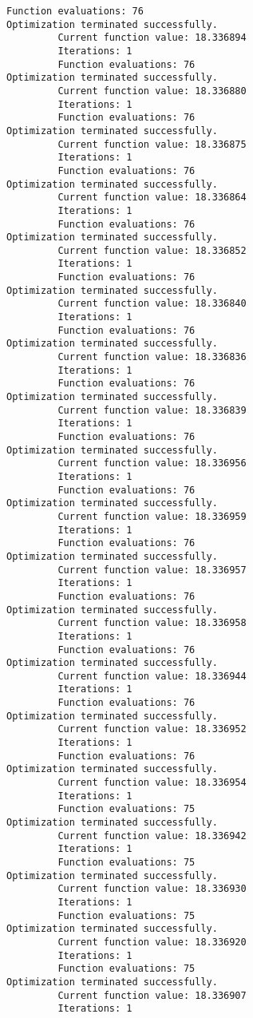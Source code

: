 \documentclass[11pt]{article}
\begin{document}
\begin{Verbatim}[commandchars=\\\{\}]
         Function evaluations: 76
Optimization terminated successfully.
         Current function value: 18.336894
         Iterations: 1
         Function evaluations: 76
Optimization terminated successfully.
         Current function value: 18.336880
         Iterations: 1
         Function evaluations: 76
Optimization terminated successfully.
         Current function value: 18.336875
         Iterations: 1
         Function evaluations: 76
Optimization terminated successfully.
         Current function value: 18.336864
         Iterations: 1
         Function evaluations: 76
Optimization terminated successfully.
         Current function value: 18.336852
         Iterations: 1
         Function evaluations: 76
Optimization terminated successfully.
         Current function value: 18.336840
         Iterations: 1
         Function evaluations: 76
Optimization terminated successfully.
         Current function value: 18.336836
         Iterations: 1
         Function evaluations: 76
Optimization terminated successfully.
         Current function value: 18.336839
         Iterations: 1
         Function evaluations: 76
Optimization terminated successfully.
         Current function value: 18.336956
         Iterations: 1
         Function evaluations: 76
Optimization terminated successfully.
         Current function value: 18.336959
         Iterations: 1
         Function evaluations: 76
Optimization terminated successfully.
         Current function value: 18.336957
         Iterations: 1
         Function evaluations: 76
Optimization terminated successfully.
         Current function value: 18.336958
         Iterations: 1
         Function evaluations: 76
Optimization terminated successfully.
         Current function value: 18.336944
         Iterations: 1
         Function evaluations: 76
Optimization terminated successfully.
         Current function value: 18.336952
         Iterations: 1
         Function evaluations: 76
Optimization terminated successfully.
         Current function value: 18.336954
         Iterations: 1
         Function evaluations: 75
Optimization terminated successfully.
         Current function value: 18.336942
         Iterations: 1
         Function evaluations: 75
Optimization terminated successfully.
         Current function value: 18.336930
         Iterations: 1
         Function evaluations: 75
Optimization terminated successfully.
         Current function value: 18.336920
         Iterations: 1
         Function evaluations: 75
Optimization terminated successfully.
         Current function value: 18.336907
         Iterations: 1

\end{Verbatim}
\end{document}
